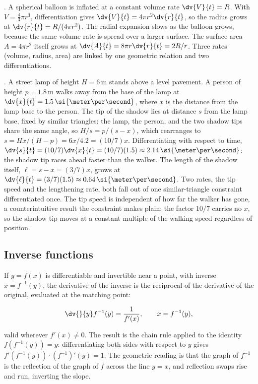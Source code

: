 . A spherical balloon is inflated at
a constant volume rate $\dv{V}{t} = R$. With $V = \tfrac{4}{3} \pi
r^{3}$, differentiation gives $\dv{V}{t} = 4 \pi r^{2} \dv{r}{t}$,
so the radius grows at $\dv{r}{t} = R / (4 \pi r^{2})$. The radial
expansion slows as the balloon grows, because the same volume rate
is spread over a larger surface. The surface area $A = 4 \pi r^{2}$
itself grows at $\dv{A}{t} = 8 \pi r \dv{r}{t} = 2 R / r$. Three
rates (volume, radius, area) are linked by one geometric relation
and two differentiations.

. A street lamp of height
$H = 6\,\si{\meter}$ stands above a level pavement. A person of
height $p = 1.8\,\si{\meter}$ walks away from the base of the lamp
at $\dv{x}{t} = 1.5\,\si{\meter\per\second}$, where $x$ is the
distance from the lamp base to the person. The tip of the shadow
lies at distance $s$ from the lamp base, fixed by similar triangles:
the lamp, the person, and the two shadow tips share the same angle,
so $H/s = p/(s - x)$, which rearranges to $s = Hx/(H - p) =
6x/4.2 = (10/7)x$. Differentiating with respect to time,
$\dv{s}{t} = (10/7)\dv{x}{t} = (10/7)(1.5) \approx 2.14\,
\si{\meter\per\second}$: the shadow tip races ahead faster than the
walker. The length of the shadow itself, $\ell = s - x = (3/7)x$,
grows at $\dv{\ell}{t} = (3/7)(1.5) \approx 0.64\,\si{\meter\per
\second}$. Two rates, the tip speed and the lengthening rate, both
fall out of one similar-triangle constraint differentiated once. The
tip speed is independent of how far the walker has gone, a
counterintuitive result the constraint makes plain: the factor
$10/7$ carries no $x$, so the shadow tip moves at a constant
multiple of the walking speed regardless of position.

\subsection{Inverse functions}

If $y = f(x)$ is differentiable and invertible near a point, with
inverse $x = f^{-1}(y)$, the derivative of the inverse is the
reciprocal of the derivative of the original, evaluated at the
matching point:

\[
\dv{}{y} f^{-1}(y) = \frac{1}{f'(x)}, \qquad x = f^{-1}(y),
\]

valid wherever $f'(x) \neq 0$. The result is the chain rule applied
to the identity $f(f^{-1}(y)) = y$: differentiating both sides with
respect to $y$ gives $f'(f^{-1}(y)) \cdot (f^{-1})'(y) = 1$. The
geometric reading is that the graph of $f^{-1}$ is the reflection
of the graph of $f$ across the line $y = x$, and reflection swaps
rise and run, inverting the slope.

